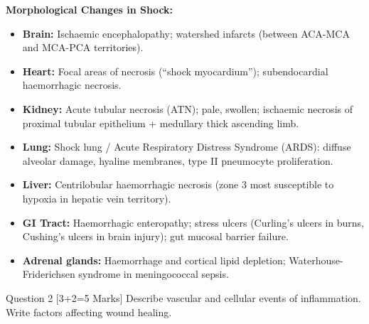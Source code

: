 \documentclass[11pt,a4paper]{article}
\begin{document}
\begin{ansbox}
\textbf{Morphological Changes in Shock:}
\begin{itemize}[leftmargin=*]
    \item \textbf{Brain:} Ischaemic encephalopathy; watershed infarcts (between ACA-MCA and MCA-PCA territories).
    \item \textbf{Heart:} Focal areas of necrosis (``shock myocardium''); subendocardial haemorrhagic necrosis.
    \item \textbf{Kidney:} Acute tubular necrosis (ATN); pale, swollen; ischaemic necrosis of proximal tubular epithelium + medullary thick ascending limb.
    \item \textbf{Lung:} Shock lung / Acute Respiratory Distress Syndrome (ARDS): diffuse alveolar damage, hyaline membranes, type II pneumocyte proliferation.
    \item \textbf{Liver:} Centrilobular haemorrhagic necrosis (zone 3 most susceptible to hypoxia in hepatic vein territory).
    \item \textbf{GI Tract:} Haemorrhagic enteropathy; stress ulcers (Curling's ulcers in burns, Cushing's ulcers in brain injury); gut mucosal barrier failure.
    \item \textbf{Adrenal glands:} Haemorrhage and cortical lipid depletion; Waterhouse-Friderichsen syndrome in meningococcal sepsis.
\end{itemize}
\end{ansbox}

\begin{qbox}{Question 2 [3+2=5 Marks]}
Describe vascular and cellular events of inflammation. Write factors affecting wound healing.
\end{qbox}
\end{document}
